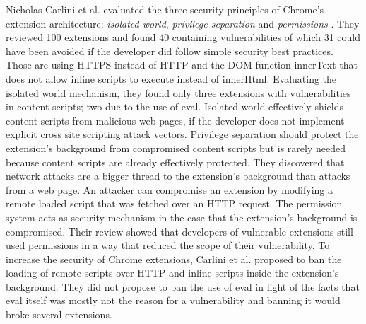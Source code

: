 \documentclass[article,colorback,accentcolor=tud9c,type=bsc]{tudthesis}
\begin{document}
	Nicholas Carlini et al. evaluated the three security principles of Chrome's extension architecture: \textit{isolated world}, \textit{privilege separation} and \textit{permissions} \cite{Carlini:2012:EGC:2362793.2362800}. They reviewed 100 extensions and found 40 containing vulnerabilities of which 31 could have been avoided if the developer did follow simple security best practices. Those are using HTTPS instead of HTTP and the DOM function innerText that does not allow inline scripts to execute instead of innerHtml. Evaluating the isolated world mechanism, they found only three extensions with vulnerabilities in content scripts; two due to the use of eval. Isolated world effectively shields content scripts from malicious web pages, if the developer does not implement explicit cross site scripting attack vectors. Privilege separation should protect the extension's background from compromised content scripts but is rarely needed because content scripts are already effectively protected. They discovered that network attacks are a bigger thread to the extension's background than attacks from a web page. An attacker can compromise an extension by modifying a remote loaded script that was fetched over an HTTP request. The permission system acts as security mechanism in the case that the extension's background is compromised. Their review showed that developers of vulnerable extensions still used permissions in a way that reduced the scope of their vulnerability. To increase the security of Chrome extensions, Carlini et al. proposed to ban the loading of remote scripts over HTTP and inline scripts inside the extension's background. They did not propose to ban the use of eval in light of the facts that eval itself was mostly not the reason for a vulnerability and banning it would broke several extensions. 
		
\end{document}
